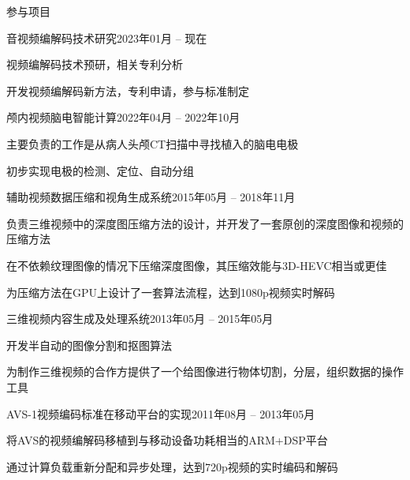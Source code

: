 \documentclass{resume} %
\begin{document}

\begin{rSection}{参与项目}
    \begin{rSubsection}{音视频编解码技术研究}{2023年01月 -- 现在}{}{}
        \item 视频编解码技术预研，相关专利分析
		\item 开发视频编解码新方法，专利申请，参与标准制定
    \end{rSubsection}

    \begin{rSubsection}{颅内视频脑电智能计算}{2022年04月 -- 2022年10月}{}{}
        \item 主要负责的工作是从病人头颅CT扫描中寻找植入的脑电电极
        \item 初步实现电极的检测、定位、自动分组
    \end{rSubsection}

    \begin{rSubsection}{辅助视频数据压缩和视角生成系统}{2015年05月 -- 2018年11月}{}{}
        \item 负责三维视频中的深度图压缩方法的设计，并开发了一套原创的深度图像和视频的压缩方法
        \item 在不依赖纹理图像的情况下压缩深度图像，其压缩效能与3D-HEVC相当或更佳
        \item 为压缩方法在GPU上设计了一套算法流程，达到1080p视频实时解码
    \end{rSubsection}

    \begin{rSubsection}{三维视频内容生成及处理系统}{2013年05月 -- 2015年05月}{}{}
        \item 开发半自动的图像分割和抠图算法
        \item 为制作三维视频的合作方提供了一个给图像进行物体切割，分层，组织数据的操作工具
    \end{rSubsection}

    \begin{rSubsection}{AVS-1视频编码标准在移动平台的实现}{2011年08月 -- 2013年05月}{}{}
        \item 将AVS的视频编解码移植到与移动设备功耗相当的ARM+DSP平台
        \item 通过计算负载重新分配和异步处理，达到720p视频的实时编码和解码
    \end{rSubsection}

\end{rSection}
\end{document}
